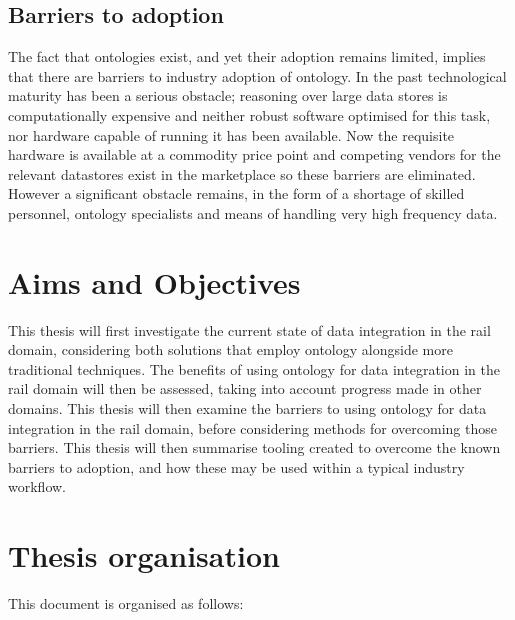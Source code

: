 \subsection{Barriers to adoption}
The fact that ontologies exist, and yet their adoption remains limited, implies that there are barriers to industry adoption of ontology. In the past technological maturity has been a serious obstacle; reasoning over large data stores is computationally expensive and neither robust software optimised for this task, nor hardware capable of running it has been available. Now the requisite hardware is available at a commodity price point and competing vendors for the relevant datastores exist in the marketplace so these barriers are eliminated. However a significant obstacle remains, in the form of a shortage of skilled personnel, ontology specialists and means of handling very high frequency data.

\section{Aims and Objectives}
This thesis will first investigate the current state of data integration in the rail domain, considering both solutions that employ ontology alongside more traditional techniques. The benefits of using ontology for data integration in the rail domain will then be assessed, taking into account progress made in other domains. This thesis will then examine the barriers to using ontology for data integration in the rail domain, before considering methods for overcoming those barriers. This thesis will then summarise tooling created to overcome the known barriers to adoption, and how these may be used within a typical industry workflow.

\section{Thesis organisation}
This document is organised as follows:

